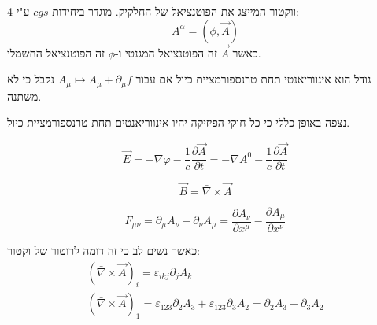 \documentclass{tstextbook}
\begin{document}
\begin{definition}[4 פוטנציאל]
4 ווקטור המייצג את הפוטנציאל של החלקיק. מוגדר ביחידות \(cgs\) ע"י: 
$$A^{\alpha}=(\phi,\vec{A})$$
כאשר \(\vec{A}\) זה הפוטנציאל המגנטי ו-\(\phi\) זה הפוטנציאל החשמלי.

\end{definition}
\begin{definition}
גודל הוא אינווריאנטי תחת טרנספורמציית כיול אם עבור \(A_{\mu}\mapsto A_{\mu}+\partial_{\mu }f\) נקבל כי לא משתנה.

\end{definition}
\begin{remark}
נצפה באופן כללי כי כל חוקי הפיזיקה יהיו אינווריאנטים תחת טרנספורמציית כיול.

\end{remark}
\begin{definition}
$${\vec{E}}=-{\bar{\nabla}}\varphi-{\frac{1}{c}}{\frac{\partial{\vec{A}}}{\partial t}}=-\bar{\nabla} A^0 - \frac{1}{c}\frac{\partial \vec{A}}{\partial t} $$

\end{definition}
\begin{definition}
$$ {\vec{B}}={\bar{\nabla}}\times{\vec{A}}$$

\end{definition}
\begin{definition}
$$F_{\mu \nu}=\partial_{\mu}A_{\nu}-\partial_{\nu}A_{\mu}=\frac{\partial A_{\nu}}{\partial x^\mu}-\frac{\partial A_{\mu}}{\partial x^\nu} $$

\end{definition}
כאשר נשים לב כי זה דומה לרוטור של וקטור:
\begin{gather*}\left( \bar{\nabla} \times \vec{A} \right)_{i}=\varepsilon_{ikj}\partial_{j}A_{k}  \\\left( \bar{\nabla} \times \vec{A} \right)_{1}=\varepsilon_{123} \partial_{2}A_{3}+\varepsilon_{123}\partial_{3}A_{2}=\partial_{2}A_{3}-\partial_{3}A_{2}
\end{gather*}
\end{document}

